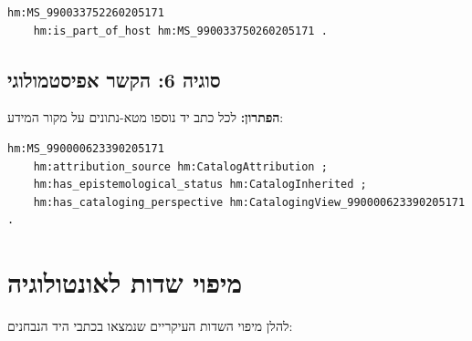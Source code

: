 \documentclass[12pt,a4paper]{article}
\newcommand{\en}[1]{\textenglish{\LR{#1}}}
\begin{document}
\begin{lstlisting}[style=ttl]
hm:MS_990033752260205171 
    hm:is_part_of_host hm:MS_990033750260205171 .
\end{lstlisting}

\subsection{סוגיה 6: הקשר אפיסטמולוגי}

\textbf{הפתרון:} לכל כתב יד נוספו מטא-נתונים על מקור המידע:

\begin{lstlisting}[style=ttl]
hm:MS_990000623390205171 
    hm:attribution_source hm:CatalogAttribution ;
    hm:has_epistemological_status hm:CatalogInherited ;
    hm:has_cataloging_perspective hm:CatalogingView_990000623390205171 .
\end{lstlisting}

\section{מיפוי שדות \en{MARC} לאונטולוגיה}

להלן מיפוי השדות העיקריים שנמצאו בכתבי היד הנבחנים:
\end{document}
